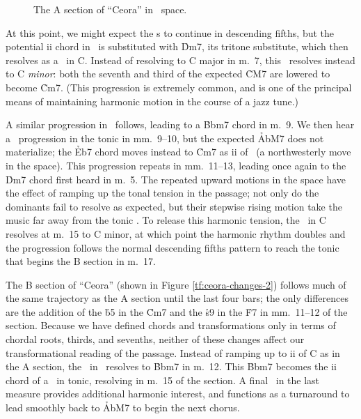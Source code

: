 \begin{figure}[htbp]
  \caption{The A section of ``Ceora'' in \tf\ space.}
  \label{tf:ceora-space-1}
\end{figure}

At this point, we might expect the \tf{}s to continue in descending fifths,
but the potential ii chord in \Gflat\ is substituted with \h{Dm7}, its
tritone substitute, which then resolves as a \tf\ in C. Instead of
resolving to C major in m.~7, this \tf\ resolves instead to C \emph{minor}:
both the seventh and third of the expected \h{CM7} are lowered to become
\h{Cm7}. (This progression is extremely common, and is one of the principal
means of maintaining harmonic motion in the course of a jazz tune.)

A similar progression in \Bflat\ follows, leading to a \h{Bbm7} chord in m.~9.
We then hear a \tf\ progression in the tonic in mm.~9--10, but the
expected \h{AbM7} does not materialize; the \h{Eb7} chord moves instead to
\h{Cm7} as ii of \Bflat\ (a northwesterly move in the space). This
progression repeats in mm.~11--13, leading once again to the \h{Dm7} chord
first heard in m.~5. The repeated upward motions in the space have the
effect of ramping up the tonal tension in the passage; not only do the
dominants fail to resolve as expected, but their stepwise rising motion take
the music far away from the tonic \Aflat. To release this harmonic tension,
the \tf\ in C resolves at m.~15 to C minor, at which point the harmonic rhythm
doubles and the progression follows the normal descending fifths pattern to
reach the tonic that begins the B section in m.~17.

The B section of ``Ceora'' (shown in Figure \ref{tf:ceora-changes-2}) follows
much of the same trajectory as the A section until the last four bars; the
only differences are the addition of the \h{b5} in the \h{Cm7} and the \h{s9}
in the \h{F7} in mm.~11--12 of the section. Because we have defined chords and
transformations only in terms of chordal roots, thirds, and sevenths, neither
of these changes affect our transformational reading of the passage. Instead
of ramping up to ii of C as in the A section, the \tf\ in \Bflat\
resolves to \h{Bbm7} in m.~12. This \h{Bbm7} becomes the ii chord of a \tfo\
in tonic, resolving in m.~15 of the section. A final \tf\ in the last measure
provides additional harmonic interest, and functions as a turnaround to lead
smoothly back to \h{AbM7} to begin the next chorus.

